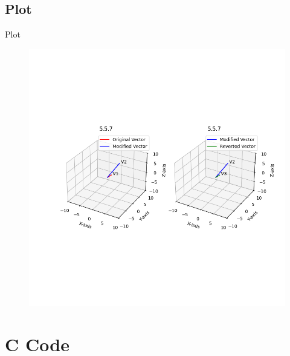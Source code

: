 \documentclass{beamer}
\theoremstyle{remark}
\numberwithin{equation}{section}
\begin{document}
\subsection{Plot}
\begin{frame}{Plot}
 \begin{figure}[H]
    \centering
    \includegraphics[width=0.8\columnwidth]{../figs/plot.png}
    \caption*{}
    \label{fig:plot}
\end{figure}
\end{frame}

\section{C Code}
\end{document}
